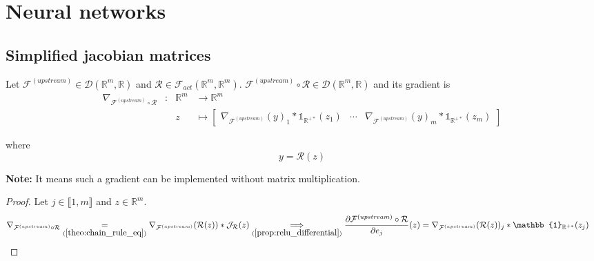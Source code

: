 \documentclass[11pt,en]{elegantpaper}
\newcommand{\Real}{\mathbb{R}}
\begin{document}
\section{Neural networks}

\subsection{Simplified jacobian matrices}

\begin{proposition}
  {\normalfont
    Let $\mathcal{F}^{(upstream)} \in \mathcal{D}(\Real^m,\Real)$ and
    $\mathcal{R} \in \mathcal{F}_{act}(\Real^m,\Real^m)$.
    $\mathcal{F}^{(upstream)} \circ \mathcal{R} \in \mathcal{D}(\Real^m,\Real)$ and its gradient is \begin{equation} \label{prop:relu_simplified_differential}
      \begin{array}{llll}
        \nabla_{\mathcal{F}^{(upstream)} \circ \mathcal{R}} & : & \Real^m  & \longrightarrow \Real^m \\
        &   & z & \longmapsto \begin{bmatrix}
          \nabla_{\mathcal{F}^{(upstream)}}(y)_1 * \mathbb{1}_{\Real^{+*}}(z_1) & \cdots &
            \nabla_{\mathcal{F}^{(upstream)}}(y)_m * \mathbb{1}_{\Real^{+*}}(z_m)
        \end{bmatrix}
      \end{array}
    \end{equation} \par
    where \begin{equation*}
      y = \mathcal{R}(z)
    \end{equation*}

    \textbf{Note:} It means such a gradient can be implemented without matrix multiplication.
  }
\end{proposition}

\begin{proof}
  Let $j \in \llbracket 1,m \rrbracket$ and $z \in \Real^m$.
  \begin{equation*}
    \begin{split}
      \nabla_{\mathcal{F}^{(upstream)} \circ \mathcal{R}} \underset{(\ref{theo:chain_rule_eq})}{=}
        \nabla_{\mathcal{F}^{(upstream)}}(\mathcal{R}(z)) * \mathcal{J}_{\mathcal{R}}(z) &
      \underset{(\ref{prop:relu_differential})}\implies \frac{\partial \mathcal{F}^{(upstream)} \circ \mathcal{R}}{\partial e_j}(z)
        = \nabla_{\mathcal{F}^{(upstream)}}(\mathcal{R}(z))_j * \mathbb{1}_{\Real^{+*}}(z_j)
    \end{split}
  \end{equation*}
\end{proof}
\end{document}
